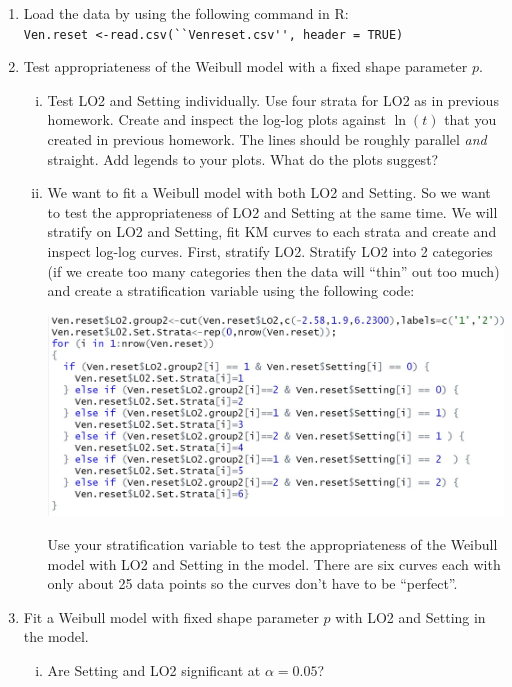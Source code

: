 \documentclass[12pt]{article}
\begin{document}
\begin{enumerate}[1.]
\item Load the data by using the following command in R: \\
 \lstinline{Ven.reset <-read.csv(``Venreset.csv'', header = TRUE)}

\item Test appropriateness of the Weibull model with a fixed shape parameter $p$.
\begin{enumerate}[i.]
\item Test LO2 and Setting individually. Use four strata for LO2 as in previous homework. Create and inspect the log-log plots against $\ln(t)$ that you created in previous homework. The lines should be roughly parallel \textit{and} straight. Add legends to your plots. What do the plots suggest?
\item We want to fit a Weibull model with both LO2 and Setting. So we want to test the appropriateness of LO2 and Setting at the same time. We will stratify on LO2 and Setting, fit KM curves to each strata and create and inspect log-log curves. First, stratify LO2. Stratify LO2 into 2 categories (if we create too many categories then the data will ``thin'' out too much) and create a stratification variable using the following code:
 \begin{center}
\includegraphics[scale=.5]{HW5code.JPG}
\end{center}
Use your stratification variable to test the appropriateness of the Weibull model with LO2 and Setting in the model. There are six curves each with only about 25 data points so the curves don't have to be ``perfect''.
\end{enumerate}
\item Fit a Weibull model with fixed shape parameter $p$ with LO2 and Setting in the model.
\begin{enumerate}[i.]
\item Are Setting and LO2 significant at $\alpha=0.05$?

\end{enumerate}
\end{enumerate}
\end{document}
